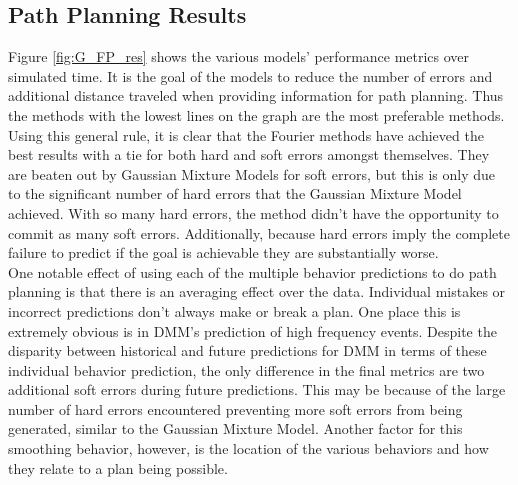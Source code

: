 \begin{table}[htb!]
  \centering
  \caption{Future Path Planning Results}
\end{table}




\subsection{ Path Planning Results }

Figure \ref{fig:G_FP_res} shows the various models' performance metrics over
simulated time. It is the goal of the models to reduce the number of errors
and additional distance traveled when providing information for path planning.
Thus the methods with the lowest lines on the graph are the most
preferable methods. Using this general rule, it is clear that the Fourier
methods have achieved the best results with a tie for both hard and soft errors
amongst themselves. They are beaten out by Gaussian Mixture Models for soft
errors, but this is only due to the significant number of hard errors that
the Gaussian Mixture Model achieved. With so many hard errors, the method
didn't have the opportunity to commit as many soft errors. Additionally,
because hard errors imply the complete failure to predict if the goal is
achievable they are substantially worse. \\

One notable effect of using each of the multiple behavior predictions to do path
planning is that there is an averaging effect over the data. Individual mistakes
or incorrect predictions don't always make or break a plan. One place this is
extremely obvious is in DMM's prediction of high frequency events.
Despite the disparity between historical and future predictions for DMM in
terms of these individual behavior prediction, the only difference in the final
metrics are two additional soft errors during future predictions. This may be
because of the large number of hard errors encountered preventing more
soft errors from being generated, similar to the Gaussian Mixture Model.
Another factor for this smoothing behavior, however, is the location of the
various behaviors and how they relate to a plan being possible. \\

